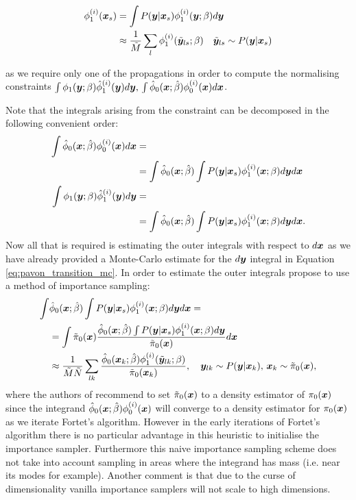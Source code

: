 \documentclass[a4paper,12pt,twoside,openright]{report}
\theoremstyle{definition}
\begin{document}
\begin{align}\label{eq:pavon_transition_mc}
    \phi_1^{(i)}({\bm{x}}_s) &= \int P({\bm{y}}| {\bm{x}}_s) \phi_1^{(i)}({\bm{y}}; \beta) d{\bm{y}} \nonumber \\
    &\approx \frac{1}{\tilde{M}} \sum_l \phi_1^{(i)}(\tilde{{\bm{y}}}_{ls}; \beta) \quad \tilde{{\bm{y}}}_{ls} \sim   P({\bm{y}}| {\bm{x}}_s)
\end{align}

as we require only one of the propagations in order to compute the normalising constraints  $\int \phi_1({\bm{y}}; {\beta} )   {\hat{\phi}}_1^{(i)}({\bm{y}}) d{\bm{y}} , \, \int {\hat{\phi}}_0({\bm{x}}; \hat{\beta} )   \phi_0^{(i)}({\bm{x}}) d{\bm{x}} $.

\cite{pavon2018data} Note that the integrals arising from the constraint can be decomposed in the following convenient order:
\begin{align}
\int {\hat{\phi}}_0({\bm{x}}; \hat{\beta} )   \phi_0^{(i)}({\bm{x}}) d{\bm{x}} &=\nonumber\\
& = \int  {\hat{\phi}}_0({\bm{x}}; \hat{\beta} ) \int P({\bm{y}}| {\bm{x}}_s) \phi_1^{(i)}({\bm{x}}; \beta) d{\bm{y}} d{\bm{x}} \\
    \int \phi_1({\bm{y}}; {\beta} )   {\hat{\phi}}_1^{(i)}({\bm{y}}) d{\bm{y}} &=\nonumber\\
    &=\int  {\hat{\phi}}_0({\bm{x}}; \hat{\beta} ) \int P({\bm{y}}| {\bm{x}}_s) \phi_1^{(i)}({\bm{x}}; \beta) d{\bm{y}} d{\bm{x}}.
\end{align}
Now all that is required is estimating the outer integrals with respect to $d{\bm{x}}$ as we have already provided a Monte-Carlo estimate for the $d{\bm{y}}$ integral in Equation \ref{eq:pavon_transition_mc}. In order to estimate the outer integrals  \cite{pavon2018data} propose to use a method of importance sampling:
\begin{align}
    \int&  {\hat{\phi}}_0({\bm{x}}; \hat{\beta} ) \int P({\bm{y}}| {\bm{x}}_s) \phi_1^{(i)}({\bm{x}}; \beta) d{\bm{y}} d{\bm{x}} = \nonumber \\
    & = \int \tilde{\pi}_0({\bm{x}}) \frac{{\hat{\phi}}_0({\bm{x}}; \hat{\beta} ) \int P({\bm{y}}| {\bm{x}}_s) \phi_1^{(i)}({\bm{x}}; \beta) d{\bm{y}}}{\tilde{\pi}_0({\bm{x}})} d{\bm{x}} \nonumber \\ 
     &\approx  \frac{1}{\tilde{M}\tilde{N}}\sum_{lk} \frac{{\hat{\phi}}_0({\bm{x}}_k; \hat{\beta} )\phi_1^{(i)}(\tilde{{\bm{y}}}_{lk}; \beta) }{\tilde{\pi}_0({\bm{x}}_k)} ,  \quad {\bm{y}}_{lk} \sim   P({\bm{y}}| {\bm{x}}_k), \, {\bm{x}}_k\sim\tilde{\pi}_0({\bm{x}}),
\end{align}
where the authors of \cite{pavon2018data} recommend  to set  $\tilde{\pi}_0({\bm{x}})$ to a density estimator of $\pi_0({\bm{x}})$ since the integrand  ${\hat{\phi}}_0({\bm{x}}; \hat{\beta} )\phi_0^{(i)}({\bm{x}})$ will converge  to a density estimator for  $\pi_0({\bm{x}})$ as we iterate Fortet's algorithm. However in the early iterations of Fortet's algorithm there is no particular advantage in this heuristic to initialise the importance sampler. Furthermore this naive importance sampling scheme does not take into account sampling in areas where the integrand has mass (i.e. near its modes for example). Another comment is that due to the curse of dimensionality vanilla importance samplers will not scale to high dimensions.
\end{document}
